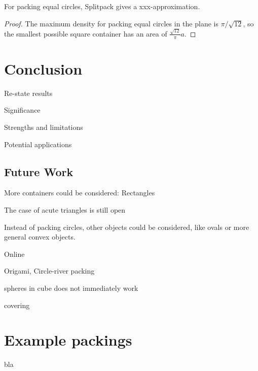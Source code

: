 \documentclass[a4paper,style=print,bibliography=totoc,nexus,lnum,extramargin]{tubsbook}
\begin{document}
\begin{theorem}
    For packing equal circles, Splitpack gives a xxx-approximation.
\end{theorem}

\begin{proof}
    The maximum density for packing equal circles in the plane is $\pi/\sqrt{12}$, so the smallest possible square container has an area of $\frac{\sqrt{12}}{\pi}a$.
\end{proof}

\chapter{Conclusion}

Re-state results

Significance

Strengths and limitations

Potential applications

\section{Future Work}

More containers could be considered: Rectangles

The case of acute triangles is still open

Instead of packing circles, other objects could be considered, like ovals or more general convex objects.

Online

Origami, Circle-river packing

spheres in cube does not immediately work

covering

\appendix

\chapter{Example packings}

bla

\printbibliography
\end{document}
